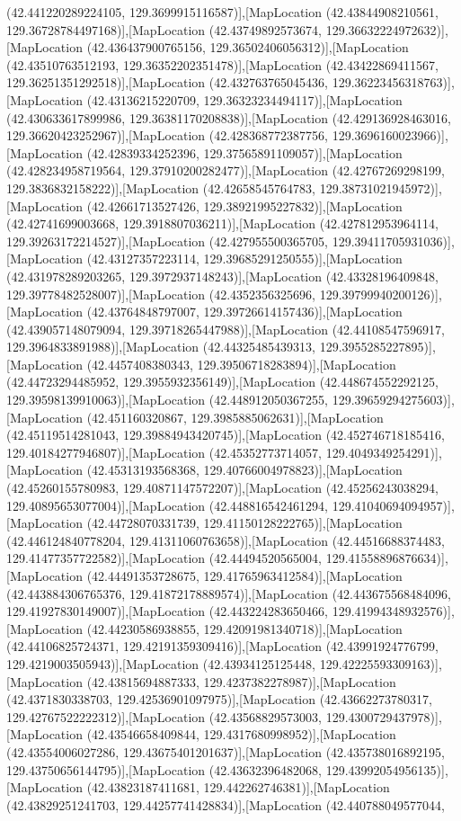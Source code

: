 (42.441220289224105, 129.3699915116587)],[MapLocation (42.43844908210561, 129.36728784497168)],[MapLocation (42.43749892573674, 129.36632224972632)],[MapLocation (42.436437900765156, 129.36502406056312)],[MapLocation (42.43510763512193, 129.36352202351478)],[MapLocation (42.43422869411567, 129.36251351292518)],[MapLocation (42.432763765045436, 129.36223456318763)],[MapLocation (42.43136215220709, 129.36323234494117)],[MapLocation (42.430633617899986, 129.36381170208838)],[MapLocation (42.429136928463016, 129.36620423252967)],[MapLocation (42.428368772387756, 129.3696160023966)],[MapLocation (42.42839334252396, 129.37565891109057)],[MapLocation (42.428234958719564, 129.37910200282477)],[MapLocation (42.42767269298199, 129.3836832158222)],[MapLocation (42.42658545764783, 129.38731021945972)],[MapLocation (42.42661713527426, 129.38921995227832)],[MapLocation (42.42741699003668, 129.3918807036211)],[MapLocation (42.427812953964114, 129.39263172214527)],[MapLocation (42.427955500365705, 129.39411705931036)],[MapLocation (42.43127357223114, 129.39685291250555)],[MapLocation (42.431978289203265, 129.3972937148243)],[MapLocation (42.43328196409848, 129.39778482528007)],[MapLocation (42.4352356325696, 129.39799940200126)],[MapLocation (42.43764848797007, 129.39726614157436)],[MapLocation (42.439057148079094, 129.39718265447988)],[MapLocation (42.44108547596917, 129.3964833891988)],[MapLocation (42.44325485439313, 129.3955285227895)],[MapLocation (42.4457408380343, 129.39506718283894)],[MapLocation (42.44723294485952, 129.3955932356149)],[MapLocation (42.448674552292125, 129.39598139910063)],[MapLocation (42.448912050367255, 129.39659294275603)],[MapLocation (42.451160320867, 129.3985885062631)],[MapLocation (42.45119514281043, 129.39884943420745)],[MapLocation (42.452746718185416, 129.40184277946807)],[MapLocation (42.45352773714057, 129.4049349254291)],[MapLocation (42.45313193568368, 129.40766004978823)],[MapLocation (42.45260155780983, 129.40871147572207)],[MapLocation (42.45256243038294, 129.40895653077004)],[MapLocation (42.448816542461294, 129.41040694094957)],[MapLocation (42.44728070331739, 129.41150128222765)],[MapLocation (42.446124840778204, 129.41311060763658)],[MapLocation (42.44516688374483, 129.41477357722582)],[MapLocation (42.44494520565004, 129.41558896876634)],[MapLocation (42.44491353728675, 129.41765963412584)],[MapLocation (42.443884306765376, 129.41872178889574)],[MapLocation (42.443675568484096, 129.41927830149007)],[MapLocation (42.443224283650466, 129.41994348932576)],[MapLocation (42.44230586938855, 129.42091981340718)],[MapLocation (42.44106825724371, 129.42191359309416)],[MapLocation (42.43991924776799, 129.4219003505943)],[MapLocation (42.43934125125448, 129.42225593309163)],[MapLocation (42.43815694887333, 129.4237382278987)],[MapLocation (42.4371830338703, 129.42536901097975)],[MapLocation (42.43662273780317, 129.42767522222312)],[MapLocation (42.43568829573003, 129.4300729437978)],[MapLocation (42.43546658409844, 129.4317680998952)],[MapLocation (42.43554006027286, 129.43675401201637)],[MapLocation (42.435738016892195, 129.43750656144795)],[MapLocation (42.43632396482068, 129.43992054956135)],[MapLocation (42.43823187411681, 129.442262746381)],[MapLocation (42.43829251241703, 129.44257741428834)],[MapLocation (42.440788049577044, 